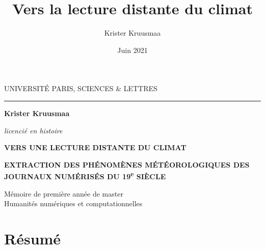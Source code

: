 \documentclass[a4paper,twoside,12pt]{article}
\title{Vers la lecture distante du climat}
\author{Krister Kruusmaa}
\date{Juin 2021}
\begin{document}


\begin{titlepage}
\begin{center}

\bigskip

\begin{large}
UNIVERSITÉ PARIS, SCIENCES \& LETTRES
\end{large}
\begin{center}\rule{2cm}{0.02cm}\end{center}

\bigskip
\bigskip
\bigskip
\begin{Large}
\textbf{Krister Kruusmaa}\\
\end{Large}
\begin{normalsize} \textit{licencié en histoire}\\
\end{normalsize}

\bigskip
\bigskip
\bigskip
\bigskip
\bigskip
\bigskip
\bigskip

\begin{Huge}
\textbf{VERS UNE LECTURE DISTANTE DU CLIMAT}\\
\end{Huge}
\bigskip
\begin{LARGE}
\textbf{EXTRACTION DES PHÉNOMÈNES MÉTÉOROLOGIQUES DES JOURNAUX NUMÉRISÉS DU 19\textsuperscript{e} SIÈCLE}\\
\end{LARGE}

\bigskip
\bigskip
\begin{large}
\end{large}
\vfill

\begin{large}
Mémoire de première année de master\\
\og Humanités numériques et computationnelles \fg{} \\
\end{large}

\end{center}
\end{titlepage}

\thispagestyle{empty}

\section*{Résumé}
\end{document}
